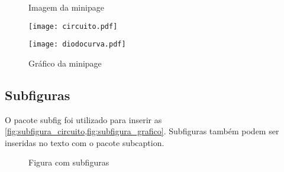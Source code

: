 \begin{figure}[htb]
    \label{fig:teste}
    \centering
    \begin{minipage}[t]{0.46\textwidth}
        \centering
        \caption{Imagem da minipage}
        \label{fig:minipage_circuito}
        \texttt{[image: circuito.pdf]} 
    \end{minipage}
    \hfill
    \begin{minipage}[t]{0.52\textwidth}
        \centering
        \caption{Gráfico da minipage}
        \label{fig:minipage_grafico}
        \texttt{[image: diodocurva.pdf]}
    \end{minipage}
\end{figure}

\subsection{Subfiguras}

O pacote \textsf{subfig} foi utilizado para inserir as \cref{fig:subfigura_circuito,fig:subfigura_grafico}. Subfiguras também podem ser inseridas no texto com o pacote \textsf{subcaption}.

\begin{figure}[htb]
    \centering
    \caption{Figura com subfiguras}
    \label{fig:subfiguras}
     \hfill
\end{figure}


